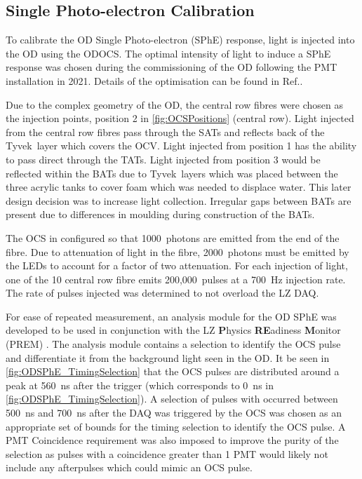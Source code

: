 \subsection{Single Photo-electron Calibration}
To calibrate the OD Single Photo-electron (SPhE) response, light is injected into the OD using the ODOCS. The optimal intensity of light to induce a SPhE response was chosen during the commissioning of the OD following the PMT installation in 2021. Details of the optimisation can be found in Ref.\cite{edfraser:thesis}.

Due to the complex geometry of the OD, the central row fibres were chosen as the injection points, position 2 in \autoref{fig:OCSPositions} (central row). Light injected from the central row fibres pass through the SATs and reflects back of the Tyvek\textregistered\ layer which covers the OCV.
Light injected from position 1 has the ability to pass direct through the TATs. Light injected from position 3 would be reflected within the BATs due to Tyvek\textregistered\ layers which was placed between the three acrylic tanks to cover foam which was needed to displace water. This later design decision was to increase light collection. Irregular gaps between BATs are present due to differences in moulding during construction of the BATs.

The OCS in configured so that 1000~photons are emitted from the end of the fibre. Due to attenuation of light in the fibre, 2000~photons must be emitted by the LEDs to account for a factor of two attenuation. For each injection of light, one of the 10 central row fibre emits 200,000~pulses at a 700~Hz injection rate. The rate of pulses injected was determined to not overload the LZ DAQ.

For ease of repeated measurement, an analysis module for the OD SPhE was developed to be used in conjunction with the LZ \textbf{P}hysics \textbf{RE}adiness \textbf{M}onitor (PREM) \cite{LZTDR}. The analysis module contains a selection to identify the OCS pulse and differentiate it from the background light seen in the OD. It be seen in \autoref{fig:ODSPhE_TimingSelection} that the OCS pulses are distributed around a peak at 560~ns after the trigger (which corresponds to 0~ns in \autoref{fig:ODSPhE_TimingSelection}). A selection of pulses with occurred between 500~ns and 700~ns after the DAQ was triggered by the OCS was chosen as an appropriate set of bounds for the timing selection to identify the OCS pulse. A PMT Coincidence requirement was also imposed to improve the purity of the selection as pulses with a coincidence greater than 1 PMT would likely not include any afterpulses which could mimic an OCS pulse.

